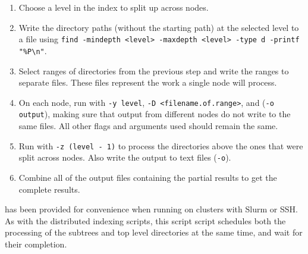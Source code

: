 \begin{enumerate}
\item Choose a level in the index to split up across nodes.
\item Write the directory paths (without the starting path) at the
  selected level to a file using \texttt{find -mindepth <level>
    -maxdepth <level> -type d -printf "\%P\textbackslash n"}.
\item Select ranges of directories from the previous step and write
  the ranges to separate files. These files represent the work a
  single node will process.
\item On each node, run \gufiquery with \texttt{-y level}, \texttt{-D
  <filename.of.range>}, and (\texttt{-o output}), making sure that output
  from different nodes do not write to the same files. All other flags
  and arguments used should remain the same.
\item Run \gufiquery with \texttt{-z (level - 1)} to process the
  directories above the ones that were split across nodes. Also write
  the output to text files (\texttt{-o}).
\item Combine all of the output files containing the partial results
  to get the complete results.
\end{enumerate}

\gufiquerydistributed has been provided for convenience when running
on clusters with Slurm or SSH. As with the distributed indexing
scripts, this script script schedules both the processing of the
subtrees and top level directories at the same time, and wait for
their completion.
